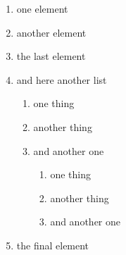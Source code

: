\documentclass[12pt, twoside]{article}
\begin{document}
\begin{enumerate} [label = \Alph*]
	\item one element
	\item another element
	\item the last element
	\item and here another list
	\begin{enumerate}
		\item one thing
		\item another thing
		\item and another one
		\begin{enumerate}
			\item one thing
			\item another thing
			\item and another one
		\end{enumerate}
	\end{enumerate}
	\item the final element
\end{enumerate}
\end{document}
